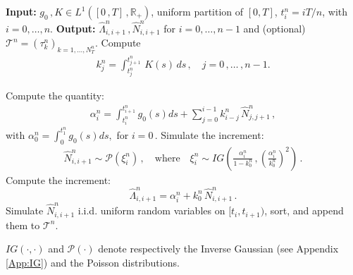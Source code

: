 \documentclass{article}
\newcommand{\R}{\mathbb{R}}
\newcommand{\1}{\mathbbm{1}}
\numberwithin{equation}{section}
\begin{document}
\begin{algorithm}[H]\label{algo:ivi_hawkes}
\caption{ \textbf{- The Hawkes iVi scheme:} Simulation of \( \widehat \Lambda\,, \widehat N \)}\label{alg:simulation}
\begin{algorithmic}[1]
\State \textbf{Input:} $g_0\,,K \in L^1([0\,,T]\,, \R_+)$, uniform partition of $[0,T]$, \( t_i^n = i T/n  \), with $i=0,\ldots, n$.
\State \textbf{Output:} \(  \widehat \Lambda^n_{i, i+1}\,, \widehat N^n_{i, i+1} \) for \( i = 0, \ldots, n-1 \) and (optional) $\mathcal{T}^n = (\tau_k^n)_{k=1, \ldots, N_T^n}$.
\State Compute
\begin{align}\label{eq:kij}
k_{j}^n = \int_{t^n_j}^{t^n_{j+1}}\, K\left( s\right) \, ds\,, \quad {j=0\,,\ldots\,, n-1}.
\end{align}

\State Compute the quantity:
\begin{align}\label{eq:alphai}
    \alpha^n_i  = \int_{t_i^n}^{t^n_{i+1}} g_0(s) ds + \sum_{j=0}^{i-1}   k^n_{i-j}\,\widehat N^n_{j,j+1}\,,  
\end{align}
with  $\alpha^n_0=\int_0^{t_1^n} g_0(s) ds,$  for $i=0$\,.
    \State Simulate the increment:
\begin{align}
    \label{eq:hatNsample}
    \widehat N^n_{i,i+1} \sim \mathcal P\left(\xi^n_i\right)\,, \quad \text{where} \quad \xi^n_i \sim IG\left(\frac{\alpha^n_i}{1 - k_0^n}\,, \left(\frac{\alpha^n_i}{k_0^n} \right)^2 \right)\,.
\end{align}
    \State Compute the increment:
\begin{equation}
    \label{eq:hatLambdasample}
    \widehat \Lambda^n_{i,i+1} = \alpha^n_i + k_0^n\, \widehat N^n_{i,i+1}\,.
\end{equation}
 Simulate $\widehat N^n_{i,i+1}$ i.i.d. uniform random variables on $[t_i, t_{i+1})$, sort, and append them to $\mathcal{T}^n$.

\EndFor
\end{algorithmic}
\end{algorithm}
$IG(\cdot,\cdot)$ and $\mathcal P(\cdot)$ denote respectively the Inverse Gaussian (see Appendix \ref{App:IG}) and the Poisson distributions. \\
\end{document}
